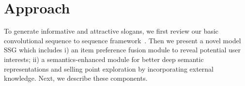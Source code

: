 \section{Approach}
\label{sec:approach}


To generate informative and attractive slogans,
we first review our basic convolutional 
sequence to sequence framework~\cite{gehring2017convolutional}. 
Then we present a novel model SSG 
which includes i) an item preference fusion module to reveal potential user interests; 
ii) a semantics-enhanced module for better deep semantic representations and selling point exploration by incorporating external knowledge.
Next, we describe these components.








